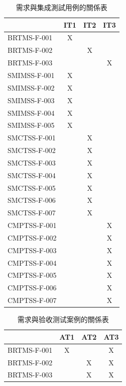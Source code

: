 \begin{enumerate}
\begin{enumerate}
					\begin{table}[htbp]
					\centering
					\caption{需求與集成測試用例的關係表}
					\label{table11}
					\begin{tabular}{|l|c|c|c|}
					\hline
					 & \multicolumn{1}{l|}{IT1} & \multicolumn{1}{l|}{IT2} & \multicolumn{1}{l|}{IT3} \\ \hline
					BRTMS-F-001 & X &  &  \\ \hline
					BRTMS-F-002 &  & X &  \\ \hline
					BRTMS-F-003 &  &  & X \\ \hline
					SMIMSS-F-001 & X &  &  \\ \hline
					SMIMSS-F-002 & X &  &  \\ \hline
					SMIMSS-F-003 & X &  &  \\ \hline
					SMIMSS-F-004 & X &  &  \\ \hline
					SMIMSS-F-005 & X &  &  \\ \hline
					SMCTSS-F-001 &  & X &  \\ \hline
					SMCTSS-F-002 &  & X &  \\ \hline
					SMCTSS-F-003 &  & X &  \\ \hline
					SMCTSS-F-004 &  & X &  \\ \hline
					SMCTSS-F-005 &  & X &  \\ \hline
					SMCTSS-F-006 &  & X &  \\ \hline
					SMCTSS-F-007 &  & X &  \\ \hline
					CMPTSS-F-001 &  &  & X \\ \hline
					CMPTSS-F-002 &  &  & X \\ \hline
					CMPTSS-F-003 & \multicolumn{1}{l|}{} & \multicolumn{1}{l|}{} & X \\ \hline
					CMPTSS-F-004 & \multicolumn{1}{l|}{} & \multicolumn{1}{l|}{} & X \\ \hline
					CMPTSS-F-005 & \multicolumn{1}{l|}{} & \multicolumn{1}{l|}{} & X \\ \hline
					CMPTSS-F-006 & \multicolumn{1}{l|}{} & \multicolumn{1}{l|}{} & X \\ \hline
					CMPTSS-F-007 & \multicolumn{1}{l|}{} & \multicolumn{1}{l|}{} & X \\ \hline
					\end{tabular}
					\end{table}

					\begin{table}[htbp]
					\centering
					\caption{需求與验收测试案例的關係表}
					\label{table12}
					\begin{tabular}{|l|c|c|c|}
					\hline
					 & \multicolumn{1}{l|}{AT1} & \multicolumn{1}{l|}{AT2} & \multicolumn{1}{l|}{AT3} \\ \hline
					BRTMS-F-001 & X &  & X \\ \hline
					BRTMS-F-002 &  & X & X \\ \hline
					BRTMS-F-003 &  & X & X \\ \hline
					\end{tabular}
					\end{table}
				\end{enumerate}
		\end{enumerate}
